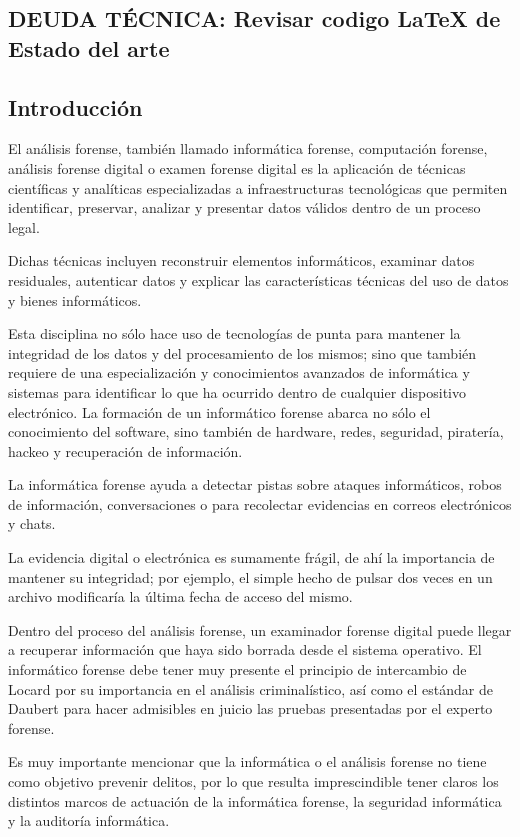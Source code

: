 \subsection{{\color{red}\textbf{DEUDA TÉCNICA: Revisar codigo LaTeX de Estado del arte}}}

\subsection{Introducción}

El análisis forense, también llamado informática forense, computación forense, análisis forense digital o examen forense digital es la aplicación de técnicas científicas y analíticas especializadas a infraestructuras tecnológicas que permiten identificar, preservar, analizar y presentar datos válidos dentro de un proceso legal.

Dichas técnicas incluyen reconstruir elementos informáticos, examinar datos residuales, autenticar datos y explicar las características técnicas del uso de datos y bienes informáticos.

Esta disciplina no sólo hace uso de tecnologías de punta para mantener la integridad de los datos y del procesamiento de los mismos; sino que también requiere de una especialización y conocimientos avanzados de informática y sistemas para identificar lo que ha ocurrido dentro de cualquier dispositivo electrónico. La formación de un informático forense abarca no sólo el conocimiento del software, sino también de hardware, redes, seguridad, piratería, hackeo y recuperación de información.

La informática forense ayuda a detectar pistas sobre ataques informáticos, robos de información, conversaciones o para recolectar evidencias en correos electrónicos y chats.

La evidencia digital o electrónica es sumamente frágil, de ahí la importancia de mantener su integridad; por ejemplo, el simple hecho de pulsar dos veces en un archivo modificaría la última fecha de acceso del mismo.

Dentro del proceso del análisis forense, un examinador forense digital puede llegar a recuperar información que haya sido borrada desde el sistema operativo. El informático forense debe tener muy presente el principio de intercambio de Locard por su importancia en el análisis criminalístico, así como el estándar de Daubert para hacer admisibles en juicio las pruebas presentadas por el experto forense.

Es muy importante mencionar que la informática o el análisis forense no tiene como objetivo prevenir delitos, por lo que resulta imprescindible tener claros los distintos marcos de actuación de la informática forense, la seguridad informática y la auditoría informática.

